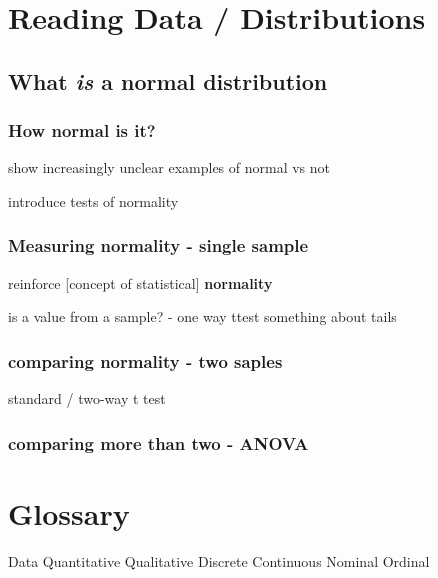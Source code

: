 \documentclass[
]{book}
\begin{document}
\hypertarget{reading-data-distributions}{%
\section*{Reading Data / Distributions}\label{reading-data-distributions}}

\hypertarget{what-is-a-normal-distribution}{%
\subsection{\texorpdfstring{What \emph{is} a \textbf{normal distribution}}{What is a normal distribution}}\label{what-is-a-normal-distribution}}

\hypertarget{how-normal-is-it}{%
\subsubsection{How normal is it?}\label{how-normal-is-it}}

show increasingly unclear examples of normal vs not

introduce tests of normality

\hypertarget{measuring-normality---single-sample}{%
\subsubsection{Measuring normality - single sample}\label{measuring-normality---single-sample}}

reinforce {[}concept of statistical{]} \textbf{normality}

is a value from a sample? - one way ttest
something about tails

\hypertarget{comparing-normality---two-saples}{%
\subsubsection{comparing normality - two saples}\label{comparing-normality---two-saples}}

standard / two-way t test

\hypertarget{comparing-more-than-two---anova}{%
\subsubsection{comparing more than two - ANOVA}\label{comparing-more-than-two---anova}}

\hypertarget{glossary-3}{%
\section*{Glossary}\label{glossary-3}}

Data
Quantitative
Qualitative
Discrete
Continuous
Nominal
Ordinal

  
\end{document}
